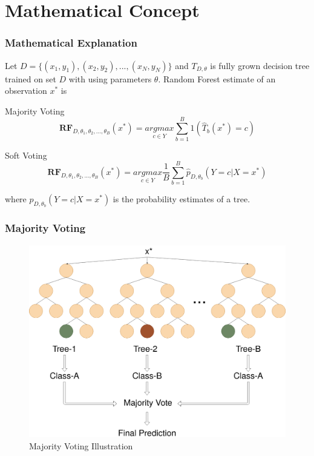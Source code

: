 \section{Mathematical Concept}

\begin{frame}
    \frametitle{Mathematical Explanation}
    Let $D = \{(x_{1},y_{1}), (x_{2}, y_{2}), ... , (x_{N}, y_{N})\}$ 
    and $T_{D,\theta}$ is fully grown decision tree trained on set $D$ with using parameters $\theta$.
    Random Forest estimate of an observation $x^*$ is
    \begin{block}{Majority Voting}
        \begin{equation}
            \boldsymbol{RF}_{D, \theta_{1}, \theta_{2}, ..., \theta_{B}} (x^*) =
            \underset{c \in Y}{argmax} \sum_{b = 1}^{B}{1(\hat{T}_{b}(x^*) = c)}
        \end{equation}
    \end{block}
    \begin{block}{Soft Voting}
        \begin{equation}
            \boldsymbol{RF}_{D, \theta_{1}, \theta_{2}, ..., \theta_{B}} (x^*) =
            \underset{c \in Y}{argmax} \dfrac{1}{B}\sum_{b = 1}^{B}{\hat{p}_{D, \theta_{b}} (Y = c | X = x^*)}
        \end{equation}
    \end{block}
    where $\hat{p}_{D, \theta_{b}} (Y = c | X = x^*)$ is the probability estimates of a tree.
\end{frame}
\begin{frame}
    \frametitle{Majority Voting}
    \begin{figure}
        \includegraphics[height=0.7\textheight]{images/majority.png}
        \caption{Majority Voting Illustration}
    \end{figure}
\end{frame}
